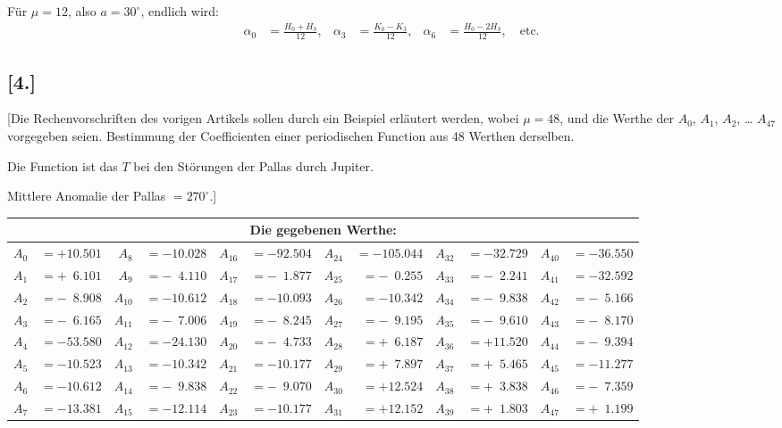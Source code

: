 \documentclass[12pt,a4paper]{article}
\begin{document}
Für $\mu = 12$, also $a = 30^{\circ}$, endlich wird:
\begin{align*}
\alpha_0 &= \tfrac{H_0 + H_3}{12}, &
\alpha_3 &= \tfrac{K_0 - K_3}{12}, &
\alpha_6 &= \tfrac{H_0 - 2H_3}{12}, \quad \text{etc.}
\end{align*}

\subsection*{[4.]}

[Die Rechenvorschriften des vorigen Artikels sollen durch ein Beispiel erläutert werden, wobei $\mu = 48$, und die Werthe der $A_0$, $A_1$, $A_2$, \ldots{} $A_{47}$ vorgegeben seien. Bestimmung der Coefficienten einer periodischen Function aus 48 Werthen derselben.

Die Function ist das $T$ bei den Störungen der Pallas durch Jupiter.

Mittlere Anomalie der Pallas $= 270^{\circ}$.]

\begin{longtable}{@{}rr|rr|rr|rr|rr|rr@{}}
\multicolumn{12}{c}{Die gegebenen Werthe:}\\
\midrule
\endhead
$A_0$ &$= +10.501$ &$A_8$ &$= -10.028$ &$A_{16}$ &$= -92.504$ &$A_{24}$ &$= -105.044$ &$A_{32}$ &$= -32.729$ &$A_{40}$ &$= -36.550$\\
$A_1$ &$= +\phantom{0}6.101$ &$A_9$ &$= -\phantom{0}4.110$ &$A_{17}$ &$= -\phantom{0}1.877$ &$A_{25}$ &$= -\phantom{0}0.255$ &$A_{33}$ &$= -\phantom{0}2.241$ &$A_{41}$ &$= -32.592$\\
$A_2$ &$= -\phantom{0}8.908$ &$A_{10}$ &$= -10.612$ &$A_{18}$ &$= -10.093$ &$A_{26}$ &$= -10.342$ &$A_{34}$ &$= -\phantom{0}9.838$ &$A_{42}$ &$= -\phantom{0}5.166$\\
$A_3$ &$= -\phantom{0}6.165$ &$A_{11}$ &$= -\phantom{0}7.006$ &$A_{19}$ &$= -\phantom{0}8.245$ &$A_{27}$ &$= -\phantom{0}9.195$ &$A_{35}$ &$= -\phantom{0}9.610$ &$A_{43}$ &$= -\phantom{0}8.170$\\
$A_4$ &$= -53.580$ &$A_{12}$ &$= -24.130$ &$A_{20}$ &$= -\phantom{0}4.733$ &$A_{28}$ &$= +\phantom{0}6.187$ &$A_{36}$ &$= +11.520$ &$A_{44}$ &$= -\phantom{0}9.394$\\
$A_5$ &$= -10.523$ &$A_{13}$ &$= -10.342$ &$A_{21}$ &$= -10.177$ &$A_{29}$ &$= +\phantom{0}7.897$ &$A_{37}$ &$= +\phantom{0}5.465$ &$A_{45}$ &$= -11.277$\\
$A_6$ &$= -10.612$ &$A_{14}$ &$= -\phantom{0}9.838$ &$A_{22}$ &$= -\phantom{0}9.070$ &$A_{30}$ &$= +12.524$ &$A_{38}$ &$= +\phantom{0}3.838$ &$A_{46}$ &$= -\phantom{0}7.359$\\
$A_7$ &$= -13.381$ &$A_{15}$ &$= -12.114$ &$A_{23}$ &$= -10.177$ &$A_{31}$ &$= +12.152$ &$A_{39}$ &$= +\phantom{0}1.803$ &$A_{47}$ &$= +\phantom{0}1.199$\\
\bottomrule
\end{longtable}
\end{document}
